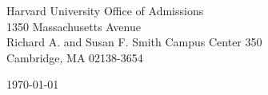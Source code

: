 \begin{minipage}{0.49\textwidth}
\begin{flushleft}
\noindent
Harvard University Office of Admissions\\
1350 Massachusetts Avenue\\
Richard A. and Susan F. Smith Campus Center 350\\
Cambridge, MA 02138-3654
\end{flushleft}
\end{minipage}
\begin{minipage}{0.47\textwidth}
\begin{flushright}
\today
\end{flushright}
\end{minipage} \\

\newcommand{\univ}{Harvard University}
\newcommand{\univshort}{Harvard}
\newcommand{\degree}{Ph.D.}
\newcommand{\dept}{Computer Science}
